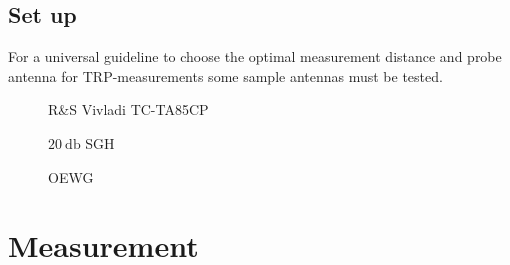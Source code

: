 \subsection{Set up}

For a universal guideline to choose the optimal measurement distance and probe antenna for \ac{TRP}-measurements some sample antennas must be tested.

\begin{figure}[h]
  \centering
  \centering
\caption{R\&{}S Vivladi TC-TA85CP}
\label{fig:vivpro}
\end{figure}

\begin{figure}[h]
  \centering
  \centering
\caption{$\SI{20}{\decibel}$ SGH}
\label{fig:hornpro}
\end{figure}

\begin{figure}[h]
  \centering
  \centering
\caption{OEWG}
\label{fig:oewgpro}
\end{figure}


\section{Measurement}